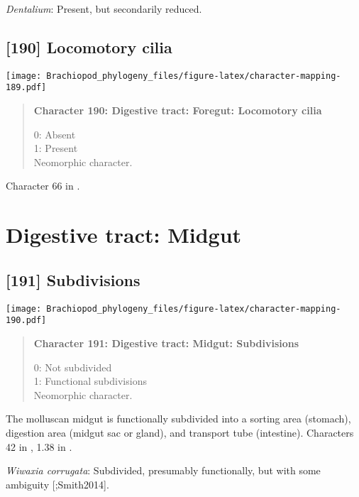 \documentclass[openany]{book}
\theoremstyle{definition}
\theoremstyle{definition}
\theoremstyle{definition}
\theoremstyle{remark}
\begin{document}
\hypertarget{Dentalium-coding-189}{}
\emph{Dentalium}: Present, but secondarily reduced.

\subsection*{{[}190{]} Locomotory cilia}\label{locomotory-cilia}

\texttt{[image: Brachiopod\_phylogeny\_files/figure-latex/character-mapping-189.pdf]}

\begin{quote}
\textbf{Character 190: Digestive tract: Foregut: Locomotory cilia}

0: Absent\\
1: Present\\
Neomorphic character.
\end{quote}

Character 66 in \citet{Haszprunar2000}.

\section{Digestive tract: Midgut}\label{digestive-tract-midgut}

\subsection*{{[}191{]} Subdivisions}\label{subdivisions}

\texttt{[image: Brachiopod\_phylogeny\_files/figure-latex/character-mapping-190.pdf]}

\begin{quote}
\textbf{Character 191: Digestive tract: Midgut: Subdivisions}

0: Not subdivided\\
1: Functional subdivisions\\
Neomorphic character.
\end{quote}

The molluscan midgut is functionally subdivided into a sorting area
(stomach), digestion area (midgut sac or gland), and transport tube
(intestine). Characters 42 in \citet{Haszprunar2000}, 1.38 in
\citet{SPS1996}.

\hypertarget{Wiwaxia_corrugata-coding-191}{}
\emph{Wiwaxia corrugata}: Subdivided, presumably functionally, but with
some ambiguity {[}\citet{Smith2012M};Smith2014{]}.
\end{document}
